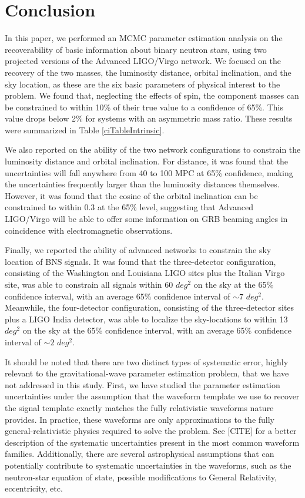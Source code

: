 \documentclass[11pt,a4paper]{emulateapj}
\newcommand{\carl}[1]{{\color{red}  #1}}
\begin{document}
\section{Conclusion}
\label{conclusionSection}

In this paper, we performed an MCMC parameter estimation analysis on the recoverability of basic information about binary 
neutron stars, using two projected versions of the Advanced LIGO/Virgo network.  We focused on the recovery of the two 
masses, the luminosity distance, orbital inclination, and the sky location, as these are the six basic parameters of physical 
interest to the problem.  We found that, neglecting the effects of spin, the component masses can be constrained to within
 10\% of their true value to a confidence of 65\%.  This value drops below 2\% for systems with an asymmetric mass ratio.
 These results were summarized in Table \ref{ciTableIntrinsic}.
 
We also reported on the ability of the two network configurations to constrain the
luminosity distance and orbital inclination.  For distance, it was found that the uncertainties
will fall anywhere from 40 to 100 MPC at 65\% confidence, making the uncertainties frequently larger than the luminosity
distances themselves.  However, it was found that the cosine of the orbital inclination can be constrained to within 
0.3 at the 65\% level, suggesting that Advanced LIGO/Virgo will be able to offer some information on GRB beaming
angles in coincidence with electromagnetic observations.

Finally, we reported the ability of advanced networks to constrain the sky location of BNS signals.  It was found that 
the three-detector configuration, consisting of the Washington and Louisiana LIGO sites plus the Italian Virgo site,
 was able to constrain all signals within 60 $deg^2$ on the sky at the 65\% confidence interval, with an average
65\% confidence interval of $\sim 7$ $deg^2$.  Meanwhile, the four-detector
configuration, consisting of the three-detector sites plus a LIGO India detector, was able to localize the sky-locations
to within  13 $deg^2$ on the sky at the 65\% confidence interval, with an average
65\% confidence interval of $\sim 2$ $deg^2$.

It should be noted that there are two distinct types of systematic error, highly relevant to the gravitational-wave parameter estimation problem, that we have not addressed in this study.  First, we have studied the parameter estimation uncertainties under the assumption that the waveform template we use to recover the signal template exactly matches the fully relativistic waveforms nature provides.  In practice, these waveforms are only approximations to the fully general-relativistic physics required to solve the problem.  See \carl{[CITE]} for a better description of the systematic uncertainties present in the most common waveform families.  Additionally, there are several astrophysical assumptions that can potentially contribute
to systematic uncertainties in the waveforms, such as the neutron-star equation of state, possible modifications to 
General Relativity, eccentricity, etc.
\end{document}
